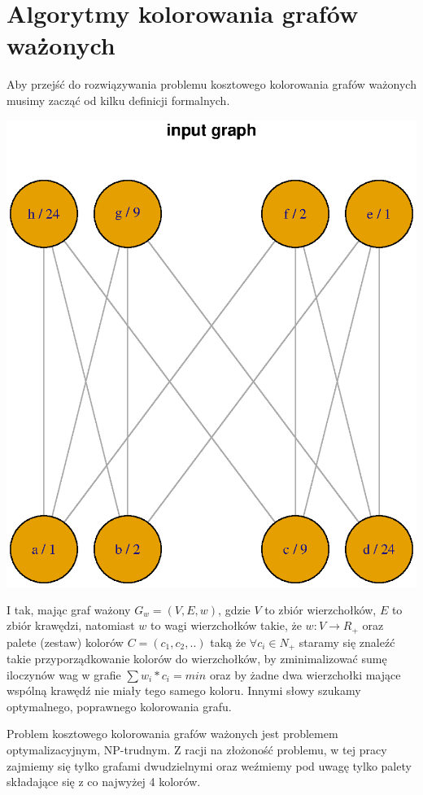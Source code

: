 \documentclass{article}
\begin{document}
\section{Algorytmy kolorowania grafów ważonych}

Aby przejść do rozwiązywania problemu kosztowego kolorowania grafów ważonych musimy zacząć od kilku definicji formalnych. 

\includegraphics[scale=0.6]{graphs/reference_graph.eps}

I tak, mając graf ważony $G_w = (V,E,w)$, gdzie $V$ to zbiór wierzchołków, $E$ to zbiór krawędzi, natomiast $w$ to wagi wierzchołków takie, że  $w:V \rightarrow R_+$ oraz palete (zestaw) kolorów $C = (c_1, c_2, ..)$ taką że $\forall c_i \in N_+$ staramy się znaleźć takie przyporządkowanie kolorów do wierzchołków, by zminimalizować sumę iloczynów wag w grafie $\sum w_i * c_i = min$ oraz by żadne dwa wierzchołki mające wspólną krawędź nie miały tego samego koloru. Innymi słowy szukamy optymalnego, poprawnego kolorowania grafu.

Problem kosztowego kolorowania grafów ważonych jest problemem optymalizacyjnym, NP-trudnym. Z racji na złożoność problemu, w tej pracy zajmiemy się tylko grafami dwudzielnymi oraz weźmiemy pod uwagę tylko palety składające się z co najwyżej 4 kolorów.
\end{document}
